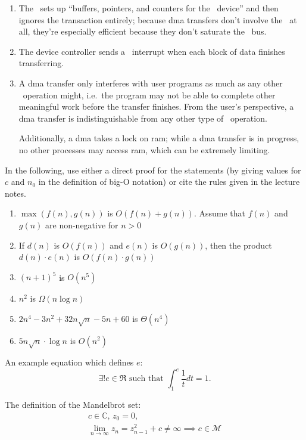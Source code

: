 \documentclass[
	gantt,
	scheme,
	assembly,
	math,
	pseudocode,
	tabu
]{brandeis-problemset}
\begin{document}
\begin{enumerate}
	\item The \cpu\ sets up ``buffers, pointers, and counters for the
		\io\ device'' and then ignores the transaction entirely;
		because \ac{dma} transfers don't involve the \cpu\ at all,
		they're especially efficient because they don't saturate the
		\cpu\ bus.
	\item The device controller sends a \cpu\ interrupt when each block of
		data finishes transferring.
	\item A \ac{dma} transfer only interferes with user programs as much
		as any other \io\ operation might, i.e.\ the program may not
		be able to complete other meaningful work before the
		transfer finishes. From the user's perspective, a \ac{dma}
		transfer is indistinguishable from any other type of \io\
		operation.

		Additionally, a \ac{dma} takes a lock on \ac{ram}; while a
		\ac{dma} transfer is in progress, no other processes may
		access \ac{ram}, which can be extremely limiting.
\end{enumerate}

\begin{problem}
	In the following, use either a direct proof for the statements (by
	giving values for $c$ and $n_0$ in the definition of big-O notation)
	or cite the rules given in the lecture notes.

	\begin{enumerate}
		\item $\max(f(n), g(n))$ is $O(f(n) + g(n))$. Assume that $f(n)$
			and $g(n)$ are non-negative for $n > 0$
		\item  If $d(n)$ is $O(f(n))$ and $e(n)$ is $O(g(n))$, then
			the product $d(n) \cdot e(n)$ is $O(f(n) \cdot g(n))$
		\item $(n + 1)^5$ is $O(n^5)$
		\item $n^2$ is $\Omega(n\log n)$
		\item $2n^4 - 3n^2 + 32n\sqrt n - 5n + 60$ is $\Theta(n^4)$
		\item $5n\sqrt n \cdot \log n$ is $O(n^2)$
	\end{enumerate}
\end{problem}

An example equation which defines $e$:
\begin{equation}
	\exists! e \in \Re \text{ such that }
	\int_1^e \frac{1}{t} dt = 1.
\end{equation}

The definition of the Mandelbrot set:
\begin{equation}
\begin{split}
		c \in \mathbb{C},\, z_0 = 0, \\
		\lim_{n \to \infty} z_n = z_{n - 1}^2 + c \ne \infty
		\implies c \in \mathcal{M}
\end{split}
\end{equation}
\end{document}
